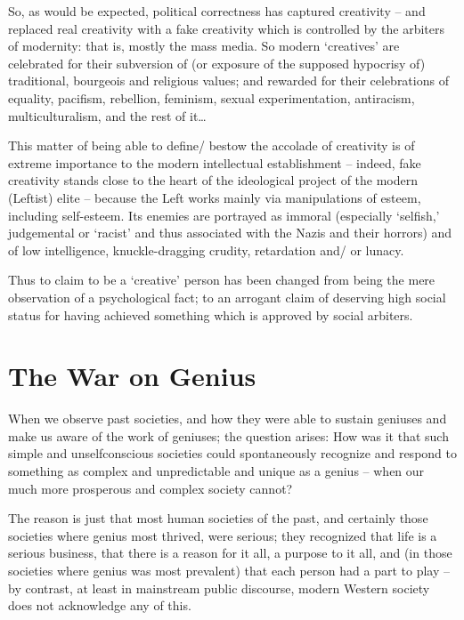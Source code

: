 \documentclass[
]{book}
\begin{document}
So, as would be expected, political correctness has captured creativity -- and replaced real creativity with a fake creativity which is controlled by the arbiters of modernity: that is, mostly the mass media. So modern `creatives' are celebrated for their subversion of (or exposure of the supposed hypocrisy of) traditional, bourgeois and religious values; and rewarded for their celebrations of equality, pacifism, rebellion, feminism, sexual experimentation, antiracism, multiculturalism, and the rest of it\ldots{}

This matter of being able to define/ bestow the accolade of creativity is of extreme importance to the modern intellectual establishment -- indeed, fake creativity stands close to the heart of the ideological project of the modern (Leftist) elite -- because the Left works mainly via manipulations of esteem, including self-esteem. Its enemies are portrayed as immoral (especially `selfish,' judgemental or `racist' and thus associated with the Nazis and their horrors) and of low intelligence, knuckle-dragging crudity, retardation and/ or lunacy.

Thus to claim to be a `creative' person has been changed from being the mere observation of a psychological fact; to an arrogant claim of deserving high social status for having achieved something which is approved by social arbiters.

\hypertarget{the-war-on-genius}{%
\chapter{The War on Genius}\label{the-war-on-genius}}

When we observe past societies, and how they were able to sustain geniuses and make us aware of the work of geniuses; the question arises: How was it that such simple and unselfconscious societies could spontaneously recognize and respond to something as complex and unpredictable and unique as a genius -- when our much more prosperous and complex society cannot?

The reason is just that most human societies of the past, and certainly those societies where genius most thrived, were serious; they recognized that life is a serious business, that there is a reason for it all, a purpose to it all, and (in those societies where genius was most prevalent) that each person had a part to play -- by contrast, at least in mainstream public discourse, modern Western society does not acknowledge any of this.
\end{document}
